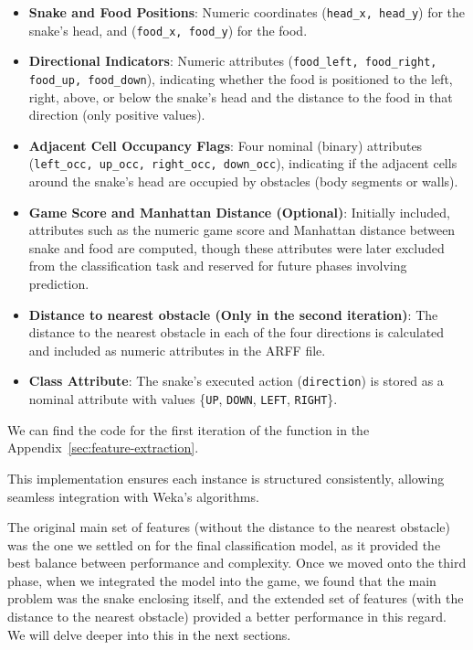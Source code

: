 \documentclass[12pt,a4paper]{article}
\begin{document}
\begin{itemize}
    \item \textbf{Snake and Food Positions}: Numeric coordinates (\texttt{head\_x, head\_y}) for the snake's head, and (\texttt{food\_x, food\_y}) for the food.

    \item \textbf{Directional Indicators}: Numeric attributes (\texttt{food\_left, food\_right, food\_up, food\_down}), indicating whether the food is positioned to the left, right, above, or below the snake’s head and the distance to the food in that direction (only positive values).

    \item \textbf{Adjacent Cell Occupancy Flags}: Four nominal (binary) attributes (\texttt{left\_occ, up\_occ, right\_occ, down\_occ}), indicating if the adjacent cells around the snake’s head are occupied by obstacles (body segments or walls).

    \item \textbf{Game Score and Manhattan Distance (Optional)}: Initially included, attributes such as the numeric game score and Manhattan distance between snake and food are computed, though these attributes were later excluded from the classification task and reserved for future phases involving prediction.

    \item \textbf{Distance to nearest obstacle (Only in the second iteration)}: The distance to the nearest obstacle in each of the four directions is calculated and included as numeric attributes in the ARFF file.

    \item \textbf{Class Attribute}: The snake’s executed action (\texttt{direction}) is stored as a nominal attribute with values \{\texttt{UP}, \texttt{DOWN}, \texttt{LEFT}, \texttt{RIGHT}\}.
\end{itemize}

We can find the code for the first iteration of the function in the Appendix~\autoref{sec:feature-extraction}.

This implementation ensures each instance is structured consistently, allowing seamless integration with Weka’s algorithms.

The original main set of features (without the distance to the nearest obstacle) was the one we settled on for the final classification model, as it provided the best balance between performance and complexity. 
Once we moved onto the third phase, when we integrated the model into the game, we found that the main problem was the snake enclosing itself, and the extended set of features (with the distance to the nearest obstacle) provided a better performance in this regard.
We will delve deeper into this in the next sections.
\end{document}
